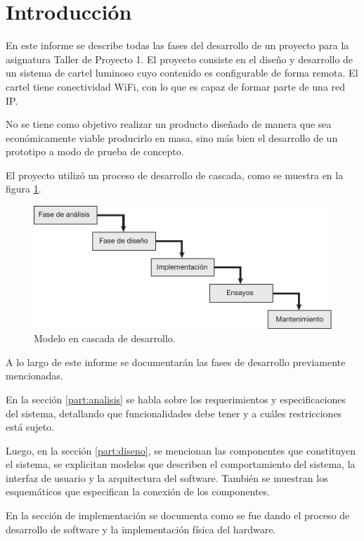 \section{Introducción}
En este informe se describe todas las fases del desarrollo de un proyecto para la asignatura Taller de Proyecto 1. El proyecto consiste en el diseño y desarrollo de un sistema de cartel luminoso cuyo contenido es configurable de forma remota. El cartel tiene conectividad WiFi, con lo que es capaz de formar parte de una red IP.

No se tiene como objetivo realizar un producto diseñado de manera que sea económicamente viable producirlo en masa, sino más bien el desarrollo de un prototipo a modo de prueba de concepto.

El proyecto utilizó un proceso de desarrollo de cascada, como se muestra en la figura \ref{fig:waterfall}.

\begin{figure}[!htbp]
	\centering
	\includegraphics[width=0.8\linewidth]{imagenes/waterfall.pdf}
	\caption{Modelo en cascada de desarrollo.}
	\label{fig:waterfall}
\end{figure}

A lo largo de este informe se documentarán las fases de desarrollo previamente mencionadas.

En la sección \ref{part:analisis} se habla sobre los requerimientos y especificaciones del sistema, detallando que funcionalidades debe tener y a cuáles restricciones está sujeto.

Luego, en la sección \ref{part:diseno}, se mencionan las componentes que constituyen el sistema, se explicitan modelos que describen el comportamiento del sistema, la interfaz de usuario y la arquitectura del software. También se muestran los esquemáticos que especifican la conexión de los componentes.

En la sección de implementación se documenta como se fue dando el proceso de desarrollo de software y la implementación física del hardware.

